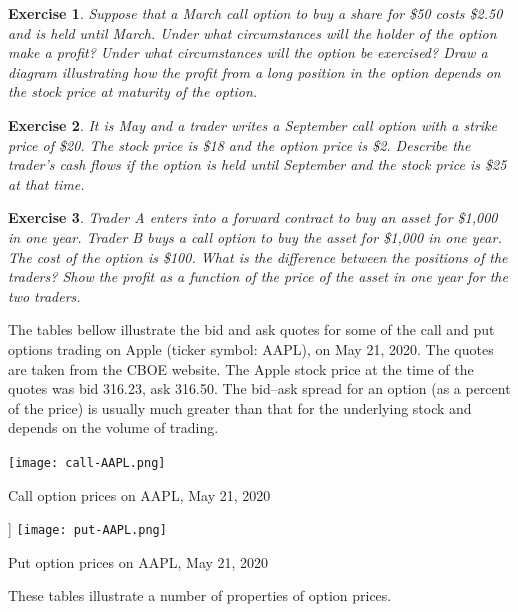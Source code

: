 \documentclass[letterpaper,10pt]{article}
\newtheorem{ex}{Exercise}
\begin{document}
\begin{ex}
Suppose that a March call option to buy a share for \$50 costs \$2.50 and is held until March. Under what circumstances will the holder of the option make a profit? Under what circumstances will the option be exercised? Draw a diagram illustrating how the profit from a long position in the option depends on the stock price at maturity of the option.
\end{ex}


\begin{ex}
It is May and a trader writes a September call option with a strike price of \$20. The stock price is \$18 and the option price is \$2. Describe the trader’s cash flows if the option is held until September and the stock price is \$25 at that time.
\end{ex}


\begin{ex}
Trader A enters into a forward contract to buy an asset for \$1,000 in one year. Trader B buys a call option to buy the asset for \$1,000 in one year. The cost of the option is \$100. What is the difference between the positions of the traders? Show the profit as a function of the price of the asset in one year for the two traders.
\end{ex}


The tables bellow illustrate the bid and ask quotes for some of the call and put options trading on Apple (ticker symbol: AAPL), on May 21, 2020. The quotes are taken from the CBOE website. The Apple stock price at the time of the quotes was bid 316.23, ask 316.50. The bid–ask spread for an option (as a percent of the price) is usually much greater than that for the underlying stock and depends on the volume of trading.

\begin{center}
\begin{table}[H]
\texttt{[image: call-AAPL.png]}
\caption{Call option prices on AAPL, May 21, 2020}
\label{call-AAPL}
\end{table}
\end{center}

\begin{center}
\begin{table}[H]]
\texttt{[image: put-AAPL.png]}
\caption{Put option prices on AAPL, May 21, 2020}
\label{put-AAPL}
\end{table}
\end{center}

These tables illustrate a number of properties of option prices.
\end{document}
